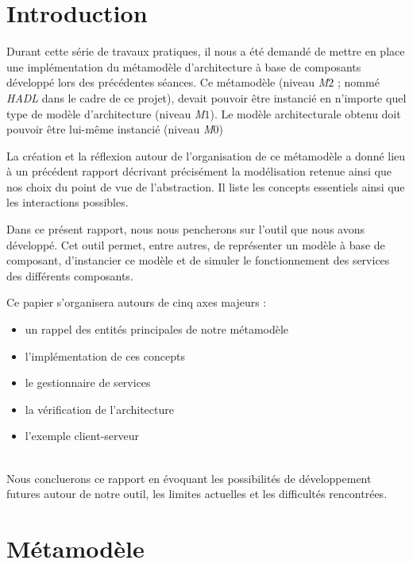 \chapter*{Introduction}
	Durant cette série de travaux pratiques, il nous a été demandé de mettre en place une implémentation du métamodèle d'architecture à base de composants développé lors des précédentes séances. Ce métamodèle (niveau \emph{M$2$} ; nommé \emph{HADL} dans le cadre de ce projet), devait pouvoir être instancié en n'importe quel type de modèle d'architecture (niveau \emph{M$1$}). Le modèle architecturale obtenu doit pouvoir être lui-même instancié (niveau \emph{M$0$})
    \newline
    
    La création et la réflexion autour de l'organisation de ce métamodèle a donné lieu à un précédent rapport décrivant précisément la modélisation retenue ainsi que nos choix du point de vue de l'abstraction. Il liste les concepts essentiels ainsi que les interactions possibles.
    \newline
    
    Dans ce présent rapport, nous nous pencherons sur l'outil que nous avons développé. Cet outil permet, entre autres, de représenter un modèle à base de composant, d'instancier ce modèle et de simuler le fonctionnement des services des différents composants.
    \newline
    
    Ce papier s'organisera autours de cinq axes majeurs :
    ~\\
    \begin{itemize}
    	\item un rappel des entités principales de notre métamodèle
        \item l'implémentation de ces concepts
        \item le gestionnaire de services
        \item la vérification de l'architecture
        \item l'exemple client-serveur
    \end{itemize}
	~\\
    Nous concluerons ce rapport en évoquant les possibilités de développement futures autour de notre outil, les limites actuelles et les difficultés rencontrées.
    
\chapter{Métamodèle}

